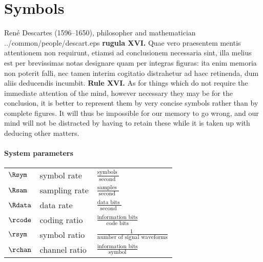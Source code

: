 
\chapter*{Symbols}
\qboxnpqt
  {
    Ren\'e Descartes (1596--1650), philosopher and mathematician
    \footnotemark
  }
  {../common/people/descart.eps}
  {{\bf rugula XVI.} 
      Quae vero praesentem mentis attentionem non requirunt, 
      etiamsi ad conclusionem necessaria sint, 
      illa melius est per brevissimas notas designare quam per integras figuras: 
      ita enim memoria non poterit falli, nec tamen interim cogitatio distrahetur 
      ad haec retinenda, dum aliis deducendis incumbit.}
  {{\bf Rule XVI.} 
      As for things which do not require the immediate attention of the mind, 
      however necessary they may be for the conclusion, 
      it is better to represent them by very concise symbols rather than by 
      complete figures. 
      It will thus be impossible for our memory to go wrong, 
      and our mind will not be distracted by having to retain these 
      while it is taken up with deducing other matters.}



\subsubsection*{System parameters}
\begin{tabular}{lll}
  $\Rsym $   & symbol rate    & $\frac{\mbox{symbols         }}{\mbox{second   }}          $ \\
  $\Rsam $   & sampling rate  & $\frac{\mbox{samples         }}{\mbox{second   }}          $ \\
  $\Rdata$   & data rate      & $\frac{\mbox{data bits       }}{\mbox{second   }}          $ \\
  $\rcode$   & coding ratio   & $\frac{\mbox{information bits}}{\mbox{code bits}}          $ \\
  $\rsym $   & symbol ratio   & $\frac{\mbox{1               }}{\mbox{number of signal waveforms}} $ \\
  $\rchan$   & channel ratio  & $\frac{\mbox{information bits}}{\mbox{symbol}}             $ 
\end{tabular}

